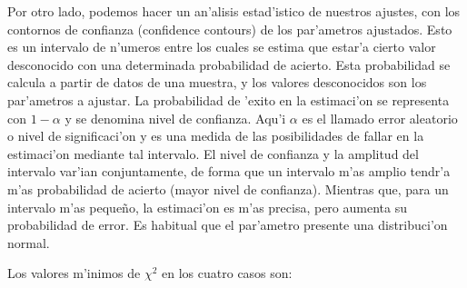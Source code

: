 Por otro lado, podemos hacer un an'alisis estad'istico de nuestros ajustes, con los contornos de confianza (confidence contours) de los
par'ametros ajustados. Esto es un intervalo de n'umeros entre los cuales se estima que estar'a cierto valor
desconocido con una determinada probabilidad de acierto. Esta probabilidad se calcula a partir de datos de una muestra, y los valores desconocidos
son los par'ametros a ajustar. La probabilidad de 'exito en la estimaci'on se representa con $1-\alpha$ y se denomina nivel de confianza. Aqu'i $\alpha$ 
es el llamado error aleatorio o nivel de significaci'on y es una medida de las posibilidades de fallar en la estimaci'on mediante tal intervalo.
El nivel de confianza y la amplitud del intervalo var'ian conjuntamente, de forma que un intervalo m'as amplio tendr'a m'as probabilidad
de acierto (mayor nivel de confianza). Mientras que, para un intervalo m'as peque\~no, la estimaci'on es m'as precisa, pero aumenta su
probabilidad de error. Es habitual que el par'ametro presente una distribuci'on normal.

Los valores m'inimos de $\chi^2$ en los cuatro casos son:


